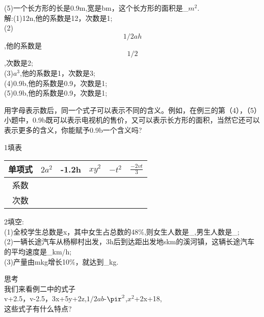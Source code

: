 \documentclass{ctexart}
\begin{document}
\begin{article}

\begin{example}
(5)一个长方形的长是0.9m,宽是bm，这个长方形的面积是_$m^{2}$.\\
解:(1)12n,他的系数是12，次数是1;\\
(2)$$1/2ah$$,他的系数是$$1/2$$,次数是2;\\
(3)$a^{3}$,他的系数是1，次数是3;\\
(4)0.9b,他的系数是0.9，次数是1;\\
(5)0.9b,他的系数是0.9，次数是1;\\

\end{example}
用字母表示数后，同一个式子可以表示不同的含义。例如，在例三的第（4），（5）小题中，0.9b既可以表示电视机的售价，又可以表示长方形的面积，当然它还可以表示更多的含义，你能赋予0.9b一个含义吗?\\
\begin{ex}
1填表\\
\begin{tabular}{|c|c|c|c|c|c|}
\hline  %
单项式&$2a^{2}$&-1.2h& $xy^{2}$& $-t^{2}$&$\frac{-2vt}{3}$\\
\hline
系数&&&&&\\
\hline
次数&&&&&\\
\hline
  \end{tabular}
2填空:\\
(1)全校学生总数是x，其中女生占总数的48$\%$,则女生人数是\_,男生人数是\_;\\
(2)一辆长途汽车从杨柳村出发，3h后到达距出发地skm的溪河镇，这辆长途汽车的平均速度是\_km/h;\\
(3)产量由mkg增长10$\%$，就达到\_kg.\\

\end{ex}
思考\\
我们来看例二中的式子\\
v+2.5，v-2.5，3x+5y+2z,$1/2ab$-$\pir^{2}$,$x^{2}$+2x+18,\\
这些式子有什么特点?\\
\end{article}
\end{document}
